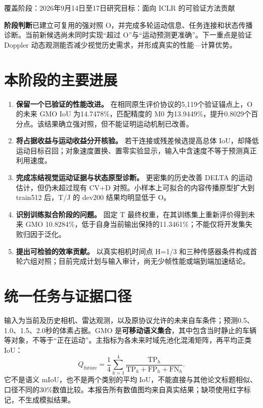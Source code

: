 \documentclass[UTF8,a4paper,11pt,fontset=none]{ctexart}
\newcommand{\pending}[1]{\textcolor{pendingred}{#1}}
\newcommand{\takeaway}[1]{\par\noindent\colorbox{pale}{\parbox{\dimexpr\linewidth-2\fboxsep}{\vspace{3pt}\textbf{阶段判断}\quad #1\vspace{3pt}}}\par}
\begin{document}
\thispagestyle{empty}
\par
\vspace{9mm}
\par
\vspace{2mm}
\par
\vspace{4mm}
\noindent\textcolor{muted}{覆盖阶段：2026年9月14日至17日\quad 研究目标：面向 ICLR 的可验证方法贡献}
\vspace{5mm}

\takeaway{已建立可复用的强对照 O，并完成多轮运动信息、任务连接和状态传播诊断。当前新候选尚未同时实现“超过 O”与“运动预测更准确”。下一重点是验证 Doppler 动态观测能否减少视觉历史需求，并形成真实的性能—计算优势。}

\section*{本阶段的主要进展}
\begin{enumerate}
\item \textbf{保留一个已验证的性能改进。} 在相同原生评价协议的5,119个验证锚点上，O 的未来 GMO IoU 为14.7478\%，匹配精度的 M0 为13.9449\%，提升0.8029个百分点。该结果确立强对照，但不能证明运动机制已改善。
\item \textbf{将占据收益与运动收益分开核验。} 若干连接或残差候选提高总体 IoU，却降低运动目标召回；对象速度置换、置零实验显示，输入中含速度不等于预测真正利用速度。
\item \textbf{完成冻结视觉运动证据与状态原型诊断。} 更密集的历史改善 DELTA 的运动估计，但仍未超过现有 CV+D 对照。小样本上可拟合的内容传播原型扩大到 train512 后，T/J 的 dev200 结果均明显低于 O。\DOverview
\item \textbf{识别训练拟合阶段的问题。} 固定 T 最终权重，在其训练集上重新评价得到未来 GMO 10.8284\%，低于自身当前输出保持的11.3461\%；不能仅将开发集失败归因于泛化。
\item \textbf{提出可检验的效率贡献。} 以真实相机时间点 H=1/3 和三种传感器条件构成首轮六组对照；目前完成计划与输入审计，\pending{尚无少帧性能或端到端加速结论}。
\end{enumerate}

\section*{统一任务与证据口径}
输入为当前及历史相机、雷达观测，以及原协议允许的未来自车条件；预测0.5、1.0、1.5、2.0秒的体素占据。GMO 是\textbf{可移动语义集合}，其中包含当时静止的车辆等对象，不等于“正在运动”。主指标为各未来时域先池化混淆矩阵，再平均正类 IoU：
\[
 Q_{\mathrm{future}}=\frac{1}{4}\sum_{h=1}^{4}
 \frac{\mathrm{TP}_h}{\mathrm{TP}_h+\mathrm{FP}_h+\mathrm{FN}_h}.
\]
它不是语义 mIoU，也不是两个类别的平均 IoU，不能直接与其他论文标题相似、口径不同的30\%数值比较。本报告所有数值图均来自真实结果；缺项使用红字标记，不生成模拟结果。
\end{document}
